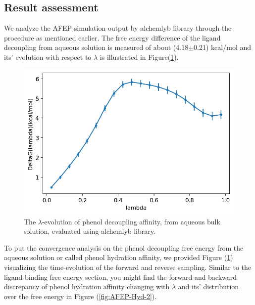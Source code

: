 \documentclass[9pt,tutorial]{livecoms}
\begin{document}
\subsection{Result assessment}
We analyze the AFEP simulation output by alchemlyb library through the procedure as mentioned earlier. The free energy difference of the ligand decoupling from aqueous solution is measured of about (4.18{$\pm$}0.21) kcal/mol and its’ evolution with respect to {$\lambda$} is illustrated in Figure(\ref{fig:AFEP-Hyd-1}).
\begin{figure}[h!t]
\centering
\includegraphics[width=0.9\linewidth]{Supp-Files/AFEP-Hydration/output/Alchemlyb/output_4_1.png}
\caption{The {$\lambda$}-evolution of phenol decoupling affinity, from aqueous bulk solution, evaluated using alchemlyb library.}
\label{fig:AFEP-Hyd-1}
\end{figure}

To put the convergence analysis on the phenol decoupling free energy from the aqueous solution or called phenol hydration affinity, we provided Figure (\ref{fig:AFEP-Hyd-1}) visualizing the time-evolution of the forward and reverse sampling. Similar to the ligand binding free energy section, you might find the forward and backward discrepancy of phenol hydration affinity changing with {$\lambda$} and its' distribution over the free energy in Figure (\ref{fig:AFEP-Hyd-2}).
\end{document}
